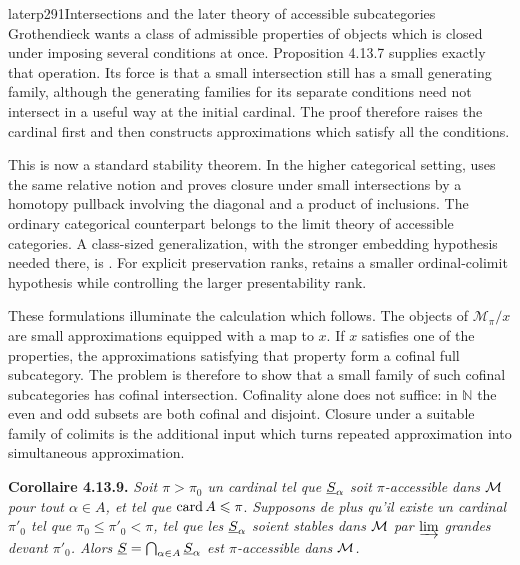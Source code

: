 \begin{dcomment}{later}{p291}{Intersections and the later theory of accessible subcategories}
Grothendieck wants a class of admissible properties of objects which is closed under imposing several conditions at once. Proposition 4.13.7 supplies exactly that operation. Its force is that a small intersection still has a small generating family, although the generating families for its separate conditions need not intersect in a useful way at the initial cardinal. The proof therefore raises the cardinal first and then constructs approximations which satisfy all the conditions.

This is now a standard stability theorem. In the higher categorical setting, \citet[Definition 5.4.7.8 and Proposition 5.4.7.10]{Lurie2009HTT} uses the same relative notion and proves closure under small intersections by a homotopy pullback involving the diagonal and a product of inclusions. The ordinary categorical counterpart belongs to the limit theory of accessible categories. A class-sized generalization, with the stronger embedding hypothesis needed there, is \citet[Corollary 3.3]{ChornyRosicky2012}. For explicit preservation ranks, \citet[Corollary 5.1 and Theorem 9.1]{Positselski2024Limits} retains a smaller ordinal-colimit hypothesis while controlling the larger presentability rank.

These formulations illuminate the calculation which follows. The objects of $\mathcal M_\pi/x$ are small approximations equipped with a map to $x$. If $x$ satisfies one of the properties, the approximations satisfying that property form a cofinal full subcategory. The problem is therefore to show that a small family of such cofinal subcategories has cofinal intersection. Cofinality alone does not suffice: in $\mathbb N$ the even and odd subsets are both cofinal and disjoint. Closure under a suitable family of colimits is the additional input which turns repeated approximation into simultaneous approximation.
\end{dcomment}


\textbf{Corollaire 4.13.9.} \textit{Soit $\pi > \pi_0$ un cardinal tel que $\underline{S}_\alpha$ soit $\pi$-accessible dans $\mathcal{M}$ pour tout $\alpha \in A$, et tel que} $\operatorname{card} A \leqslant \pi$. \textit{Supposons de plus qu'il existe un cardinal $\pi'_0$ tel que $\pi_0 \leqslant \pi'_0 < \pi$, tel que les $\underline{S}_\alpha$ soient stables dans $\mathcal{M}$ par $\varinjlim$ grandes devant $\pi'_0$. Alors $\underline{S} = \bigcap_{\alpha\in A} \underline{S}_\alpha$ est $\pi$-accessible dans $\mathcal{M}$.}

